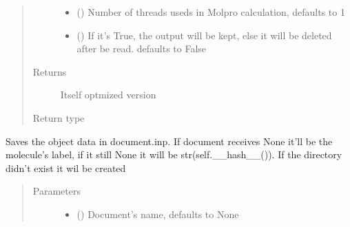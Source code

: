 \documentclass[letterpaper,10pt,english]{sphinxmanual}
\begin{document}
\begin{fulllineitems}
\begin{fulllineitems}
\begin{quote}
\begin{description}
\begin{itemize}
\item {} 
\sphinxAtStartPar
{} (\sphinxstyleliteralemphasis{\sphinxupquote{, }}) \textendash{} Number of threads useds in Molpro calculation, defaults to 1

\item {} 
\sphinxAtStartPar
{} (\sphinxstyleliteralemphasis{\sphinxupquote{, }}) \textendash{} If it’s True, the output will be kept, else it will be deleted after be read. 
defaults to False

\end{itemize}

\item[{Returns}] \leavevmode
\sphinxAtStartPar
Itself optmized version

\item[{Return type}] \leavevmode
\sphinxAtStartPar
{\hyperref[\detokenize{MolOpt.molecular:MolOpt.molecular.molecular.Molecule}]{}}

\end{description}\end{quote}

\end{fulllineitems}


\begin{fulllineitems}
\label{\detokenize{MolOpt.molecular:MolOpt.molecular.molecular.Molecule.save}}
\sphinxAtStartPar
Saves the object data in document.inp. If document receives None it’ll be the molecule’s label, if it still 
None it will be str(self.\_\_hash\_\_()). If the directory didn’t exist it wil be created
\begin{quote}\begin{description}
\item[{Parameters}] \leavevmode\begin{itemize}
\item {} 
\sphinxAtStartPar
{} (\sphinxstyleliteralemphasis{\sphinxupquote{, }}) \textendash{} Document’s name, defaults to None


\end{itemize}
\end{description}
\end{quote}
\end{fulllineitems}
\end{fulllineitems}
\end{document}
